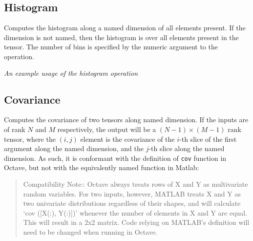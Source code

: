 \subsection{Histogram}\label{Operation:histogram}

Computes the histogram along a named dimension of all
elements present. If the dimension is not named, then the histogram
is over all elements present in the tensor. The number of bins is
specified by the numeric argument to the operation.

\begin{center}
   {\em
    An example usage of the histogram operation}
\end{center}

\subsection{Covariance}\label{Operation:covariance}

Computes the covariance of two tensors along named dimension. If the
inputs are of rank $N$ and $M$ respectively, the output will be a
$(N-1)\times(M-1)$ rank tensor, where the $(i,j)$ element is the
covariance of the $i$-th slice of the first argument along the named
dimension, and the $j$-th slice along the named dimension. As such, it
is conformant with the definition of {\tt cov} function in Octave, but
not with the equivalently named function in Matlab:
\begin{quote}
     Compatibility Note:: Octave always treats rows of X and Y as
     multivariate random variables.  For two inputs, however, MATLAB
     treats X and Y as two univariate distributions regardless of their
     shapes, and will calculate ‘cov ([X(:), Y(:)])’ whenever the number
     of elements in X and Y are equal.  This will result in a 2x2
     matrix.  Code relying on MATLAB’s definition will need to be
     changed when running in Octave.
   \end{quote}

